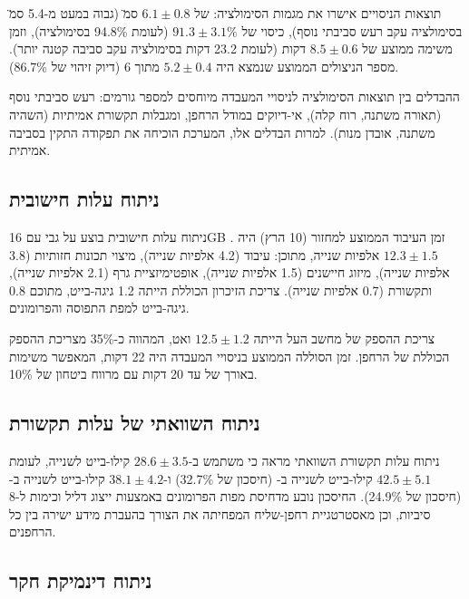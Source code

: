 תוצאות הניסויים אישרו את מגמות הסימולציה:  של $6.1 \pm 0.8$ ס\"מ (גבוה במעט מ-5.4 ס\"מ בסימולציה עקב רעש סביבתי נוסף), כיסוי של $91.3 \pm 3.1\%$ (לעומת 94.8\% בסימולציה), וזמן משימה ממוצע של $8.5 \pm 0.6$ דקות (לעומת 23.2 דקות בסימולציה עקב סביבה קטנה יותר). מספר הניצולים הממוצע שנמצא היה $5.2 \pm 0.4$ מתוך 6 (דיוק זיהוי של 86.7\%).

ההבדלים בין תוצאות הסימולציה לניסויי המעבדה מיוחסים למספר גורמים: רעש סביבתי נוסף (תאורה משתנה, רוח קלה), אי-דיוקים במודל הרחפן, ומגבלות תקשורת אמיתיות (השהיה משתנה, אובדן מנות). למרות הבדלים אלו, המערכת הוכיחה את תפקודה התקין בסביבה אמיתית.

\subsection{ניתוח עלות חישובית}
\label{sec:ch08_computational_cost}

ניתוח עלות חישובית בוצע על גבי  עם 16GB . זמן העיבוד הממוצע למחזור  (10 הרץ) היה $12.3 \pm 1.5$ אלפיות שנייה, מתוכן: עיבוד  (4.2 אלפיות שנייה), מיצוי תכונות חזותיות (3.8 אלפיות שנייה), מיזוג חיישנים (1.5 אלפיות שנייה), אופטימיזציית גרף (2.1 אלפיות שנייה), ותקשורת (0.7 אלפיות שנייה). צריכת הזיכרון הכוללת הייתה 1.2 גיגה-בייט, מתוכם 0.8 גיגה-בייט למפת התפוסה והפרומונים.

צריכת ההספק של מחשב העל הייתה $12.5 \pm 1.2$ ואט, המהווה כ-35\% מצריכת ההספק הכוללת של הרחפן. זמן הסוללה הממוצע בניסויי המעבדה היה 22 דקות, המאפשר משימות  באורך של עד 20 דקות עם מרווח ביטחון של 10\%.

\subsection{ניתוח השוואתי של עלות תקשורת}
\label{sec:ch08_comm_analysis}

ניתוח עלות תקשורת השוואתי מראה כי  משתמש ב-$28.6 \pm 3.5$ קילו-בייט לשנייה, לעומת $42.5 \pm 5.1$ קילו-בייט לשנייה ב- (חיסכון של 32.7\%) ו-$38.1 \pm 4.2$ קילו-בייט לשנייה ב- (חיסכון של 24.9\%). החיסכון נובע מדחיסת מפות הפרומונים באמצעות ייצוג דליל וכימות ל-8 סיביות, וכן מאסטרטגיית רחפן-שליח המפחיתה את הצורך בהעברת מידע ישירה בין כל הרחפנים.

\subsection{ניתוח דינמיקת חקר}
\label{sec:ch08_exploration_dynamics}

